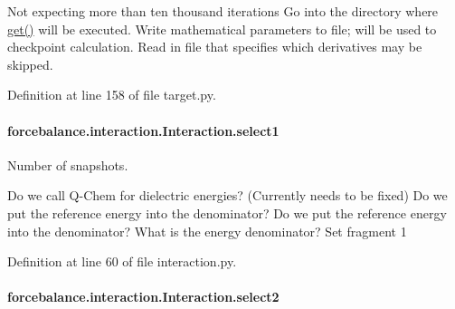 Not expecting more than ten thousand iterations Go into the directory where \hyperlink{classforcebalance_1_1target_1_1Target_a1389888302c49d529716cb45b13a6f5a}{get()} will be executed. Write mathematical parameters to file; will be used to checkpoint calculation. Read in file that specifies which derivatives may be skipped. 

Definition at line 158 of file target.\-py.

\hypertarget{classforcebalance_1_1interaction_1_1Interaction_a22c4a698eb3bf91187894fdce874e8d5}{
\paragraph[{select1}]{\setlength{\rightskip}{0pt plus 5cm}forcebalance.\-interaction.\-Interaction.\-select1\hspace{0.3cm}{\ttfamily [inherited]}}}\label{classforcebalance_1_1interaction_1_1Interaction_a22c4a698eb3bf91187894fdce874e8d5}


Number of snapshots. 

Do we call Q-\/\-Chem for dielectric energies? (Currently needs to be fixed) Do we put the reference energy into the denominator? Do we put the reference energy into the denominator? What is the energy denominator? Set fragment 1 

Definition at line 60 of file interaction.\-py.

\hypertarget{classforcebalance_1_1interaction_1_1Interaction_acbdfffa2596af6c90adf0bfe071d2205}{
\paragraph[{select2}]{\setlength{\rightskip}{0pt plus 5cm}forcebalance.\-interaction.\-Interaction.\-select2\hspace{0.3cm}{\ttfamily [inherited]}}}\label{classforcebalance_1_1interaction_1_1Interaction_acbdfffa2596af6c90adf0bfe071d2205}


